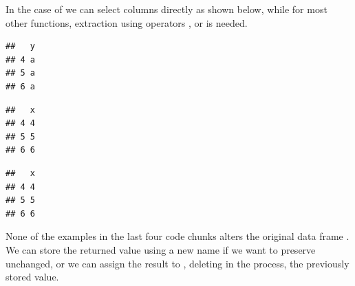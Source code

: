 \documentclass[krantz2]{krantz}\usepackage{knitr}
\begin{document}
\begin{explainbox}
In the case of  we can select columns directly as shown below, while for most other functions, extraction using operators \Roperator{[ ]}, \Roperator{[[ ]]} or \Roperator{\$} is needed.

\begin{knitrout}\footnotesize
{}\color{fgcolor}\begin{kframe}
\begin{alltt}
 \hlopt{>} \hlstd{,}  \hlstd{=} \hlstd{)}
\end{alltt}
\begin{verbatim}
##   y
## 4 a
## 5 a
## 6 a
\end{verbatim}
\begin{alltt}
 \hlopt{>} \hlstd{,}  
\end{alltt}
\begin{verbatim}
##   x
## 4 4
## 5 5
## 6 6
\end{verbatim}
\begin{alltt}
 \hlopt{>} \hlstd{,}  \hlstd{=} \hlstd{)}
\end{alltt}
\begin{verbatim}
##   x
## 4 4
## 5 5
## 6 6
\end{verbatim}
\end{kframe}
\end{knitrout}
\end{explainbox}

None of the examples in the last four code chunks alters the original data frame . We can store the returned value using a new name if we want to preserve  unchanged, or we can assign the result to , deleting in the process, the previously stored value.
\end{document}
